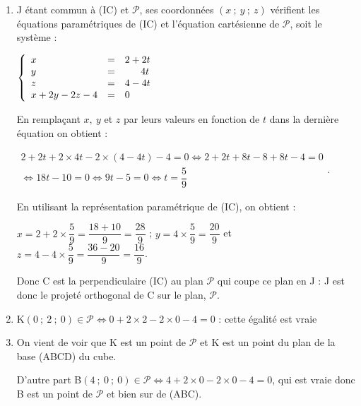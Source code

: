 \documentclass[10pt]{article}
\providecommand{\R}{\mathbb{R}}
\begin{document}
\begin{enumerate}
\begin{enumerate}
$M(x~;~y~;~z) \in \mathcal{P} \iff 2x + 4y - 4z + d = 0$, avec $d \in \R$.

Ainsi G(4~;~4~;~4) $\in \mathcal{P} \iff 2 \times 4 + 4 \times 4 - 4 \times 4 + d = 0 \iff d = - 8$.

On a donc $M(x~;~y~;~z) \in \mathcal{P} \iff 2x + 4y - 4z - 8 = 0 \iff x + 2y - 2z - 4 = 0$.


		\item 
		

J étant commun à (IC) et $\mathcal{P}$, ses coordonnées $(x~;~y~;~z)$ vérifient les équations paramétriques de (IC) et l'équation cartésienne de $\mathcal{P}$, soit le système :

$\left\{\begin{array}{l c l}
x &=&2+2t\\
y &=&\phantom{2 +~}4t\\
z &=&4 - 4t\\
x + 2y - 2z - 4 &=& 0
\end{array}\right.$ 

En remplaçant $x,\:y$ et $z$ par leurs valeurs en fonction de $t$ dans la dernière équation on obtient :

$\begin{gathered}2+2t + 2\times 4t - 2\times (4 - 4t) - 4 = 0 \iff 2 + 2t + 8t - 8  + 8t - 4 = 0\\
\iff 18t - 10 = 0\iff 9t - 5 = 0 \iff t = \dfrac{5}{9}\end{gathered}$.

En utilisant la représentation paramétrique de (IC), on obtient :

$x = 2 + 2\times \dfrac{5}{9} = \dfrac{18 + 10}{9} = \dfrac{28}{9}$ ; $y = 4 \times \dfrac59 = \dfrac{20}{9}$ et $z = 4 - 4\times \dfrac59 = \dfrac{36 - 20}{9} = \dfrac{16}{9}$.

Donc C est la perpendiculaire (IC) au plan $\mathcal{P}$ qui coupe ce plan en J : J est donc le projeté orthogonal de C sur le plan, $\mathcal{P}$.

		\item 
K$(0~;~2~;~0) \in \mathcal{P} \iff 0 + 2 \times 2 - 2\times 0 - 4 = 0$ : cette égalité est vraie

		\item 
On vient de voir que K est un point de $\mathcal{P}$ et K est un point du plan de la base (ABCD) du cube.

D'autre part B$(4~;~0~;~0) \in \mathcal{P} \iff 4 + 2 \times 0 - 2 \times 0 - 4 = 0$, qui est vraie donc B est un point de $\mathcal{P}$ et bien sur de (ABC).


\end{enumerate}
\end{enumerate}
\end{document}
